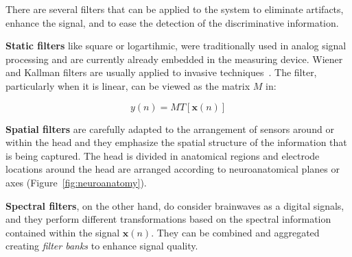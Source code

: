 There are several filters that can be applied to the system to eliminate artifacts, enhance the signal, and to ease the detection of the discriminative information.

\textbf{Static filters} like square or logartihmic, were traditionally used in analog signal processing and are currently already embedded in the measuring device.  Wiener and Kallman filters are usually applied to invasive techniques~\cite{He2013}.  The filter, particularly when it is linear, can be viewed as the matrix $M$ in:

\begin{equation}
y(n) = M T\left[\mathbf{x}(n)\right]
\label{eq:filters}
\end{equation}

\textbf{Spatial filters} are carefully adapted to the arrangement of sensors around or within the head and they emphasize the spatial structure of the information that is being captured. The head is divided in anatomical regions and electrode locations around the head are arranged according to neuroanatomical planes or axes (Figure~\ref{fig:neuroanatomy}).

\textbf{Spectral filters}, on the other hand, do consider brainwaves as a digital signals, and they perform different transformations based on the spectral information contained within the signal $\mathbf{x}(n)$.  They can be combined and aggregated creating  \textit{filter banks} to enhance signal quality. 


